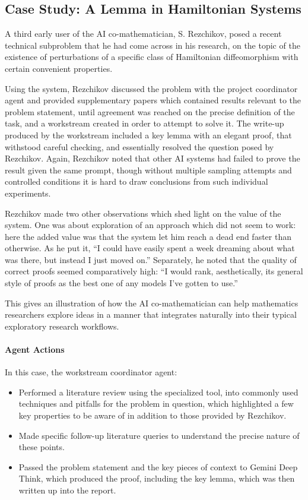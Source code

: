 \documentclass[11pt, a4paper, copyright, gdm]{google}
\begin{document}
\subsection{Case Study: A Lemma in Hamiltonian Systems}

A third early user of the AI co-mathematician, S. Rezchikov, posed a recent technical subproblem that he had come across in his research, on the topic of the existence of perturbations of a specific class of Hamiltonian diffeomorphism with certain convenient properties.

Using the system, Rezchikov discussed the problem with the project coordinator agent and provided supplementary papers which contained results relevant to the problem statement, until agreement was reached on the precise definition of the task, and a workstream created in order to attempt to solve it.
The write-up produced by the workstream included a key lemma with an elegant proof, that withstood careful checking, and essentially resolved the question posed by Rezchikov.
Again, Rezchikov noted that other AI systems had failed to prove the result given the same prompt, though without multiple sampling attempts and controlled conditions it is hard to draw conclusions from such individual experiments.

Rezchikov made two other observations which shed light on the value of the system.
One was about exploration of an approach which did not seem to work: here the added value was that the system let him reach a dead end faster than otherwise.
As he put it, ``I could have easily spent a week dreaming about what was there, but instead I just moved on.''
Separately, he noted that the quality of correct proofs seemed comparatively high: ``I would rank, aesthetically, its general style of proofs as the best one of any models I've gotten to use.''

This gives an illustration of how the AI co-mathematician can help mathematics researchers explore ideas in a manner that integrates naturally into their typical exploratory research workflows.

\paragraph{Agent Actions}

In this case, the workstream coordinator agent:
\begin{itemize}
    \item Performed a literature review using the specialized tool, into commonly used techniques and pitfalls for the problem in question, which highlighted a few key properties to be aware of in addition to those provided by Rezchikov.
    \item Made specific follow-up literature queries to understand the precise nature of these points.
    \item Passed the problem statement and the key pieces of context to Gemini Deep Think, which produced the proof, including the key lemma, which was then written up into the report.   
\end{itemize}
\end{document}
